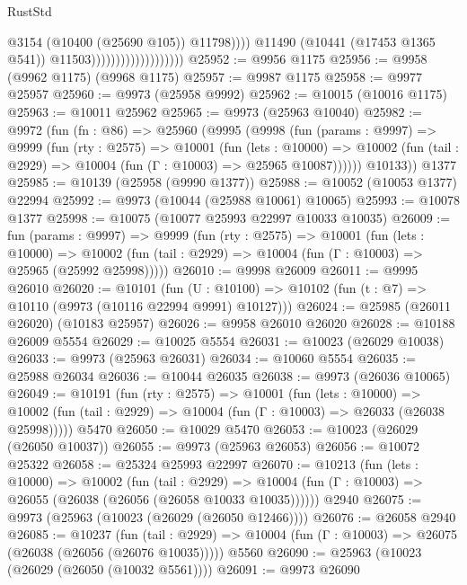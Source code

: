 \begin{lexlean}{RustStd}
\begin{coremodule}
                                                  @3154
                                                  (@10400 (@25690 @105))
                                                  @11798))))
                                          @11490
                                          (@10441 (@17453 @1365 @541))
                                          @11503)))))))))))))))))))
@25952 := @9956 @1175
@25956 := @9958 (@9962 @1175) (@9968 @1175)
@25957 := @9987 @1175
@25958 := @9977 @25957
@25960 := @9973 (@25958 @9992)
@25962 := @10015 (@10016 @1175)
@25963 := @10011 @25962
@25965 := @9973 (@25963 @10040)
@25982 := @9972
    (fun (fn : @86) =>
    @25960
      (@9995
        (@9998
          (fun (params : @9997) =>
          @9999
            (fun (rty : @2575) =>
            @10001
              (fun (lets : @10000) =>
              @10002 (fun (tail : @2929) => @10004 (fun (Γ : @10003) => @25965 @10087))))))
        @10133))
    @1377
@25985 := @10139 (@25958 (@9990 @1377))
@25988 := @10052 (@10053 @1377) @22994
@25992 := @9973 (@10044 (@25988 @10061) @10065)
@25993 := @10078 @1377
@25998 := @10075 (@10077 @25993 @22997 @10033 @10035)
@26009 := fun (params : @9997) =>
  @9999
    (fun (rty : @2575) =>
    @10001
      (fun (lets : @10000) =>
      @10002 (fun (tail : @2929) => @10004 (fun (Γ : @10003) => @25965 (@25992 @25998)))))
@26010 := @9998 @26009
@26011 := @9995 @26010
@26020 := @10101
    (fun (U : @10100) => @10102 (fun (t : @7) => @10110 (@9973 (@10116 @22994 @9991) @10127)))
@26024 := @25985 (@26011 @26020) (@10183 @25957)
@26026 := @9958 @26010 @26020
@26028 := @10188 @26009 @5554
@26029 := @10025 @5554
@26031 := @10023 (@26029 @10038)
@26033 := @9973 (@25963 @26031)
@26034 := @10060 @5554
@26035 := @25988 @26034
@26036 := @10044 @26035
@26038 := @9973 (@26036 @10065)
@26049 := @10191
    (fun (rty : @2575) =>
    @10001
      (fun (lets : @10000) =>
      @10002 (fun (tail : @2929) => @10004 (fun (Γ : @10003) => @26033 (@26038 @25998)))))
    @5470
@26050 := @10029 @5470
@26053 := @10023 (@26029 (@26050 @10037))
@26055 := @9973 (@25963 @26053)
@26056 := @10072 @25322
@26058 := @25324 @25993 @22997
@26070 := @10213
    (fun (lets : @10000) =>
    @10002
      (fun (tail : @2929) =>
      @10004 (fun (Γ : @10003) => @26055 (@26038 (@26056 (@26058 @10033 @10035))))))
    @2940
@26075 := @9973 (@25963 (@10023 (@26029 (@26050 @12466))))
@26076 := @26058 @2940
@26085 := @10237
    (fun (tail : @2929) => @10004 (fun (Γ : @10003) => @26075 (@26038 (@26056 (@26076 @10035)))))
    @5560
@26090 := @25963 (@10023 (@26029 (@26050 (@10032 @5561))))
@26091 := @9973 @26090

\end{coremodule}
\end{lexlean}
